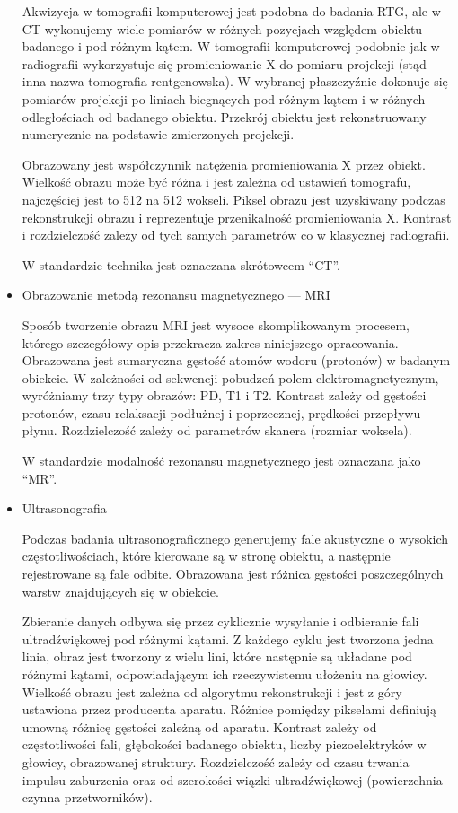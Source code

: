 \begin{itemize}
          Akwizycja w tomografii komputerowej jest podobna do badania RTG, ale w CT wykonujemy wiele pomiarów w różnych pozycjach względem obiektu badanego i pod różnym kątem.
          W tomografii komputerowej podobnie jak w radiografii wykorzystuje się promieniowanie X do pomiaru projekcji (stąd inna nazwa tomografia rentgenowska).
          W wybranej płaszczyźnie dokonuje się pomiarów projekcji po liniach biegnących pod różnym kątem i w różnych odległościach od badanego obiektu.
          Przekrój obiektu jest rekonstruowany numerycznie na podstawie zmierzonych projekcji.

          Obrazowany jest współczynnik natężenia promieniowania X przez obiekt.
          Wielkość obrazu może być różna i jest zależna od ustawień tomografu, najczęściej jest to 512 na 512 wokseli.
          Piksel obrazu jest uzyskiwany podczas rekonstrukcji obrazu i reprezentuje przenikalność promieniowania X.
          Kontrast i rozdzielczość zależy od tych samych parametrów co w klasycznej radiografii.

          W standardzie \DICOM technika jest oznaczana skrótowcem \enquote{CT}.

    \item Obrazowanie metodą rezonansu magnetycznego --- MRI

          Sposób tworzenie obrazu MRI jest wysoce skomplikowanym procesem, którego szczegółowy opis przekracza zakres niniejszego opracowania.
          Obrazowana jest sumaryczna gęstość atomów wodoru (protonów) w badanym obiekcie.
          W zależności od sekwencji pobudzeń polem elektromagnetycznym, wyróżniamy trzy typy obrazów: PD, T1 i T2.
          Kontrast zależy od gęstości protonów, czasu relaksacji podłużnej i poprzecznej, prędkości przepływu płynu.
          Rozdzielczość zależy od parametrów skanera (rozmiar woksela).

          W standardzie \DICOM modalność rezonansu magnetycznego jest oznaczana jako \enquote{MR}.

    \item Ultrasonografia

          Podczas badania ultrasonograficznego generujemy fale akustyczne o wysokich częstotliwościach, które kierowane są w stronę obiektu, a następnie rejestrowane są fale odbite.
          Obrazowana jest różnica gęstości poszczególnych warstw znajdujących się w obiekcie.

          Zbieranie danych odbywa się przez cyklicznie wysyłanie i odbieranie fali ultradźwiękowej pod różnymi kątami.
          Z każdego cyklu jest tworzona jedna linia, obraz jest tworzony z wielu lini, które następnie są układane pod różnymi kątami, odpowiadającym ich rzeczywistemu ułożeniu na głowicy.
          Wielkość obrazu jest zależna od algorytmu rekonstrukcji i jest z góry ustawiona przez producenta aparatu.
          Różnice pomiędzy pikselami definiują umowną różnicę gęstości zależną od aparatu.
          Kontrast zależy od częstotliwości fali, głębokości badanego obiektu, liczby piezoelektryków w głowicy, obrazowanej struktury.
          Rozdzielczość zależy od czasu trwania impulsu zaburzenia oraz od szerokości wiązki ultradźwiękowej (powierzchnia czynna przetworników).


\end{itemize}
